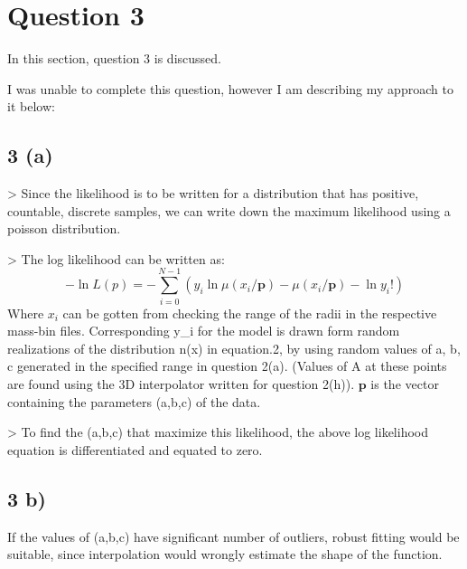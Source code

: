\section{Question 3}

In this section, question 3 is discussed.

I was unable to complete this question, however I am describing my approach to it below:

\subsection{3 (a)}
> Since the likelihood is to be written for a distribution that has positive, countable, discrete samples, we can write down the maximum likelihood using a poisson distribution.

> The log likelihood can be written as:
 $$ -\ln{L(p)} = -\sum\limits_{i=0}^{N-1} {(y_i \ln{\mu(x_i/\mathbf{p})} - \mu(x_i/\mathbf{p})- \ln{y_i!} )} $$
Where $x_i$ can be gotten from checking the range of the radii in the respective mass-bin files. Corresponding y_i for the model is drawn form random realizations of the distribution n(x) in equation.2, by using random values of a, b, c generated in the specified range in question 2(a). (Values of A at these points are found using the 3D interpolator written for question 2(h)). 
$\mathbf{p}$ is the vector containing the parameters (a,b,c) of the data.

> To find the (a,b,c) that maximize this likelihood, the above log likelihood equation is differentiated and equated to zero. 
 
 \subsection{3 b)}
If the values of (a,b,c) have significant number of outliers, robust fitting would be suitable, since interpolation would wrongly estimate the shape of the function. 
 


